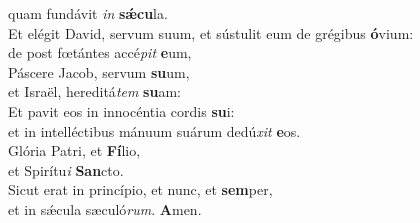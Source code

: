 \oddverse quam fundávit \textit{in} \textbf{sǽ}\textbf{cu}la.\\
\evenverse Et elégit David, servum suum, et sústulit eum de grégibus \textbf{ó}vium:~\*\\
\evenverse de post fœtántes accé\textit{pit} \textbf{e}um,\\
\oddverse Páscere Jacob, servum \textbf{su}um,~\*\\
\oddverse et Israël, hereditá\textit{tem} \textbf{su}am:\\
\evenverse Et pavit eos in innocéntia cordis \textbf{su}i:~\*\\
\evenverse et in intelléctibus mánuum suárum dedú\textit{xit} \textbf{e}os.\\
\oddverse Glória Patri, et \textbf{Fí}lio,~\*\\
\oddverse et Spirítu\textit{i} \textbf{San}cto.\\
\evenverse Sicut erat in princípio, et nunc, et \textbf{sem}per,~\*\\
\evenverse et in sǽcula sæculó\textit{rum}. \textbf{A}men.\\
